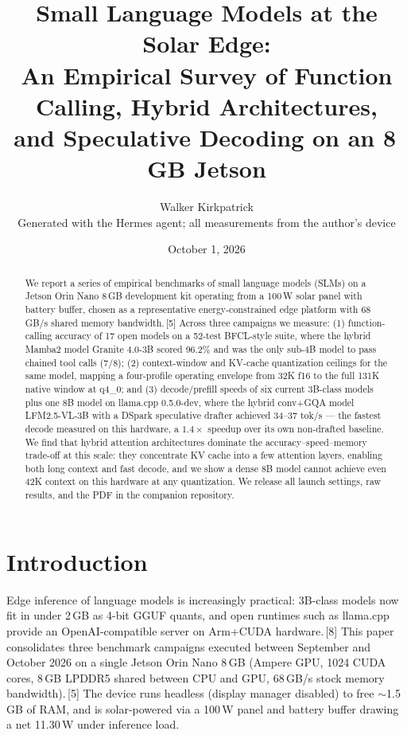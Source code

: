 \documentclass[10pt]{article}
\title{\bf Small Language Models at the Solar Edge: \\
An Empirical Survey of Function Calling, Hybrid Architectures, \\
and Speculative Decoding on an 8\,GB Jetson}
\author{Walker Kirkpatrick \\
\small Generated with the Hermes agent; all measurements from the author's device}
\date{October 1, 2026}
\begin{document}
\maketitle

\begin{abstract}
We report a series of empirical benchmarks of small language models (SLMs)
on a Jetson Orin Nano 8\,GB development kit operating from a 100\,W solar
panel with battery buffer, chosen as a representative energy-constrained
edge platform with 68\,GB/s shared memory bandwidth.\,[5] Across three
campaigns we measure: (1) function-calling accuracy of 17 open models on a
52-test BFCL-style suite, where the hybrid Mamba2 model Granite 4.0-3B
scored 96.2\% and was the only sub-4B model to pass chained tool calls
(7/8); (2) context-window and KV-cache quantization ceilings for the same
model, mapping a four-profile operating envelope from 32K f16 to the full
131K native window at q4\_0; and (3) decode/prefill speeds of six current
3B-class models plus one 8B model on llama.cpp 0.5.0-dev, where the hybrid
conv+GQA model LFM2.5-VL-3B with a DSpark speculative drafter achieved
34--37 tok/s --- the fastest decode measured on this hardware, a
$1.4\times$ speedup over its own non-drafted baseline. We find that hybrid
attention architectures dominate the accuracy--speed--memory trade-off at
this scale: they concentrate KV cache into a few attention layers, enabling
both long context and fast decode, and we show a dense 8B model cannot
achieve even 42K context on this hardware at any quantization. We release
all launch settings, raw results, and the PDF in the companion repository.
\end{abstract}

\section{Introduction}
Edge inference of language models is increasingly practical: 3B-class
models now fit in under 2\,GB as 4-bit GGUF quants, and open runtimes such
as llama.cpp provide an OpenAI-compatible server on Arm+CUDA
hardware.\,[8] This paper consolidates three benchmark campaigns executed
between September and October 2026 on a single Jetson Orin Nano 8\,GB
(Ampere GPU, 1024 CUDA cores, 8\,GB LPDDR5 shared between CPU and GPU,
68\,GB/s stock memory bandwidth).\,[5] The device runs headless (display
manager disabled) to free $\sim$1.5\,GB of RAM, and is solar-powered via a
100\,W panel and battery buffer drawing a net 11.30\,W under inference
load.
\end{document}
